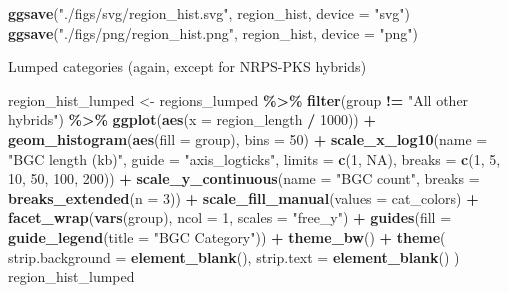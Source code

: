 \documentclass[
]{article}
\newenvironment{Shaded}{\begin{snugshade}}{\end{snugshade}}
\newcommand{\AttributeTok}[1]{\textcolor[rgb]{0.13,0.29,0.53}{#1}}
\newcommand{\ConstantTok}[1]{\textcolor[rgb]{0.56,0.35,0.01}{#1}}
\newcommand{\DecValTok}[1]{\textcolor[rgb]{0.00,0.00,0.81}{#1}}
\newcommand{\FunctionTok}[1]{\textcolor[rgb]{0.13,0.29,0.53}{\textbf{#1}}}
\newcommand{\NormalTok}[1]{#1}
\newcommand{\OtherTok}[1]{\textcolor[rgb]{0.56,0.35,0.01}{#1}}
\newcommand{\SpecialCharTok}[1]{\textcolor[rgb]{0.81,0.36,0.00}{\textbf{#1}}}
\newcommand{\StringTok}[1]{\textcolor[rgb]{0.31,0.60,0.02}{#1}}
\begin{document}
\begin{Shaded}
\begin{Highlighting}[]
\FunctionTok{ggsave}\NormalTok{(}\StringTok{"./figs/svg/region\_hist.svg"}\NormalTok{, region\_hist, }\AttributeTok{device =} \StringTok{"svg"}\NormalTok{)}
\FunctionTok{ggsave}\NormalTok{(}\StringTok{"./figs/png/region\_hist.png"}\NormalTok{, region\_hist, }\AttributeTok{device =} \StringTok{"png"}\NormalTok{)}
\end{Highlighting}
\end{Shaded}

Lumped categories (again, except for NRPS-PKS hybrids)

\begin{Shaded}
\begin{Highlighting}[]
\NormalTok{region\_hist\_lumped }\OtherTok{\textless{}{-}}\NormalTok{ regions\_lumped }\SpecialCharTok{\%\textgreater{}\%}
  \FunctionTok{filter}\NormalTok{(group }\SpecialCharTok{!=} \StringTok{"All other hybrids"}\NormalTok{) }\SpecialCharTok{\%\textgreater{}\%}
  \FunctionTok{ggplot}\NormalTok{(}\FunctionTok{aes}\NormalTok{(}\AttributeTok{x =}\NormalTok{ region\_length }\SpecialCharTok{/} \DecValTok{1000}\NormalTok{)) }\SpecialCharTok{+}
  \FunctionTok{geom\_histogram}\NormalTok{(}\FunctionTok{aes}\NormalTok{(}\AttributeTok{fill =}\NormalTok{ group), }\AttributeTok{bins =} \DecValTok{50}\NormalTok{) }\SpecialCharTok{+}
  \FunctionTok{scale\_x\_log10}\NormalTok{(}\AttributeTok{name =} \StringTok{"BGC length (kb)"}\NormalTok{, }\AttributeTok{guide =} \StringTok{"axis\_logticks"}\NormalTok{, }\AttributeTok{limits =} \FunctionTok{c}\NormalTok{(}\DecValTok{1}\NormalTok{, }\ConstantTok{NA}\NormalTok{), }\AttributeTok{breaks =} \FunctionTok{c}\NormalTok{(}\DecValTok{1}\NormalTok{, }\DecValTok{5}\NormalTok{, }\DecValTok{10}\NormalTok{, }\DecValTok{50}\NormalTok{, }\DecValTok{100}\NormalTok{, }\DecValTok{200}\NormalTok{)) }\SpecialCharTok{+}
  \FunctionTok{scale\_y\_continuous}\NormalTok{(}\AttributeTok{name =} \StringTok{"BGC count"}\NormalTok{, }\AttributeTok{breaks =} \FunctionTok{breaks\_extended}\NormalTok{(}\AttributeTok{n =} \DecValTok{3}\NormalTok{)) }\SpecialCharTok{+}
  \FunctionTok{scale\_fill\_manual}\NormalTok{(}\AttributeTok{values =}\NormalTok{ cat\_colors) }\SpecialCharTok{+}
  \FunctionTok{facet\_wrap}\NormalTok{(}\FunctionTok{vars}\NormalTok{(group), }\AttributeTok{ncol =} \DecValTok{1}\NormalTok{, }\AttributeTok{scales =} \StringTok{"free\_y"}\NormalTok{) }\SpecialCharTok{+}
  \FunctionTok{guides}\NormalTok{(}\AttributeTok{fill =} \FunctionTok{guide\_legend}\NormalTok{(}\AttributeTok{title =} \StringTok{"BGC Category"}\NormalTok{)) }\SpecialCharTok{+}
  \FunctionTok{theme\_bw}\NormalTok{() }\SpecialCharTok{+}
  \FunctionTok{theme}\NormalTok{(}
    \AttributeTok{strip.background =} \FunctionTok{element\_blank}\NormalTok{(),}
    \AttributeTok{strip.text =} \FunctionTok{element\_blank}\NormalTok{()}
\NormalTok{  )}
\NormalTok{region\_hist\_lumped}
\end{Highlighting}
\end{Shaded}
\end{document}
